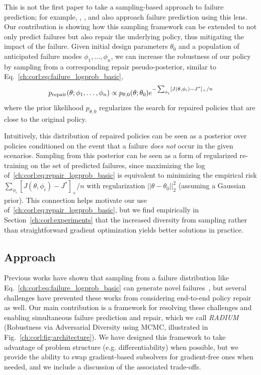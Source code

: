 This is not the first paper to take a sampling-based approach to failure prediction; for example, \cite{okellyScalableEndtoEndAutonomous2018}, \cite{sinhaNeuralBridgeSampling2020}, and \cite{zhouRoCUSRobotController2021} also approach failure prediction using this lens. Our contribution is showing how this sampling framework can be extended to not only predict failures but also repair the underlying policy, thus mitigating the impact of the failure.
%
Given initial design parameters $\theta_0$ and a population of anticipated failure modes $\phi_1, \ldots, \phi_n$, we can increase the robustness of our policy by sampling from a corresponding repair pseudo-posterior, similar to Eq.~\eqref{ch:corl:eq:failure_logprob_basic},
%
\begin{equation}
    p_{\rm{repair}}(\theta; \phi_1, \ldots, \phi_n) \propto p_{\theta, 0}(\theta; \theta_0)e^{-\sum_{\phi_i}[J(\theta, \phi_i) - J^*]_+ / n} \label{ch:corl:eq:repair_logprob_basic}
\end{equation}
%
where the prior likelihood $p_{\theta, 0}$ regularizes the search for repaired policies that are close to the original policy.

Intuitively, this distribution of repaired policies can be seen as a posterior over policies conditioned on the event that a failure \textit{does not} occur in the given scenarios. Sampling from this posterior can be seen as a form of regularized re-training on the set of predicted failures, since maximizing the log of~\eqref{ch:corl:eq:repair_logprob_basic} is equivalent to minimizing the empirical risk $\sum_{\phi_i}[J(\theta, \phi_i) - J^*]_+ / n$ with regularization $||\theta-\theta_0||_2^2$ (assuming a Gaussian prior). This connection helps motivate our use of~\eqref{ch:corl:eq:repair_logprob_basic}, but we find empirically in Section~\ref{ch:corl:experiments} that the increased diversity from sampling rather than straightforward gradient optimization yields better solutions in practice.

\subsection{Approach}

Previous works have shown that sampling from a failure distribution like Eq.~\eqref{ch:corl:eq:failure_logprob_basic} can generate novel failures~\cite{zhouRoCUSRobotController2021,sinhaNeuralBridgeSampling2020,deleckiModelbasedValidationProbabilistic2023a}, but several challenges have prevented these works from considering end-to-end policy repair as well. Our main contribution is a framework for resolving these challenges and enabling simultaneous failure prediction and repair, which we call \textit{RADIUM} (Robustness via Adversarial Diversity using MCMC, illustrated in Fig.~\ref{ch:corl:fig:architecture}). We have designed this framework to take advantage of problem structure (e.g. differentiability) when possible, but we provide the ability to swap gradient-based subsolvers for gradient-free ones when needed, and we include a discussion of the associated trade-offs.

